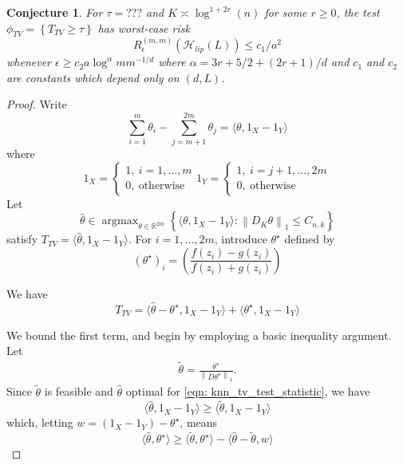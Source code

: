 \documentclass{article}
\newcommand{\Reals}{\mathbb{R}}
\newcommand{\norm}[1]{\left\lVert#1\right\rVert}
\newcommand{\set}[1]{\left\{#1\right\}}
\newcommand{\dotp}[2]{\langle #1, #2 \rangle}
\newcommand{\1}{\mathbb{I}}
\DeclareMathOperator*{\argmax}{argmax}
\newcommand{\Hclass}{\mathcal{H}}
\theoremstyle{alden}
\theoremstyle{aldenthm}
\newtheorem{conjecture}{Conjecture}
\theoremstyle{definition}
\theoremstyle{remark}
\begin{document}
\begin{conjecture}
	For $\tau = ???$ and $K \asymp \log^{1 + 2r}(n)$ for some $r \geq 0$, the test $\phi_{TV} = \set{T_{TV} \geq \tau}$ has worst-case risk
	\begin{equation*}
	R_{\epsilon}^{(m,m)}(\Hclass_{lip}(L)) \leq c_1/a^2
	\end{equation*}
	whenever $\epsilon \geq c_2 a \log^{\alpha}m m^{-1/d}$ where $\alpha = 3r + 5/2 + (2r + 1)/d$ and $c_1$ and $c_2$ are constants which depend only on $(d,L)$.
\end{conjecture}
\begin{proof}
	Write
	\begin{equation*}
	\sum_{i = 1}^{m} \theta_i - \sum_{j = m + 1}^{2m} \theta_j = \dotp{\theta}{1_X - 1_Y}
	\end{equation*}
	where
	\begin{equation*}
	1_X = 
	\begin{cases}
	1,~ i = 1, \ldots,m \\
	0,~ \text{otherwise}
	\end{cases}
	1_Y = 
	\begin{cases}
	1,~ i = j + 1, \ldots,2m \\
	0,~ \text{otherwise}
	\end{cases}
	\end{equation*}
	Let
	\begin{equation*}
	\widehat{\theta} \in \argmax_{\theta \in \Reals^{2m}} \set{\dotp{\theta}{1_X - 1_Y}: \norm{D_K \theta}_1 \leq C_{n,k}}
	\end{equation*}
	satisfy $T_{TV} = \dotp{\widehat{\theta}}{1_X - 1_Y}$. For $i = 1, \ldots, 2m$, introduce $\theta^{\star}$ defined by
	\begin{equation*}
	(\theta^{\star})_i = \left(\frac{f(z_i) - g(z_i)}{f(z_i) + g(z_i)} \right)	\end{equation*}
	
	We have
	\begin{equation*}
	T_{TV} = \dotp{\widehat{\theta} - \theta^{\star}}{1_X - 1_Y} + \dotp{\theta^{\star}}{1_X - 1_Y}
	\end{equation*}
	
	We bound the first term, and begin by employing a basic inequality argument. Let
	\begin{align*}
	\widetilde{\theta} = \frac{\theta^{\star}}{\norm{D\theta^{\star}}_1}.
	\end{align*}
	Since $\widetilde{\theta}$ is feasible and $\widehat{\theta}$ optimal for \eqref{eqn: knn_tv_test_statistic}, we have
	\begin{equation*}
	\dotp{\widehat{\theta}}{1_X - 1_Y} \geq \dotp{\widetilde{\theta}}{1_X - 1_Y}
	\end{equation*}
	which, letting $w = (1_X - 1_Y) - \theta^{\star}$, means
	\begin{equation}
	\label{eqn: basic_inequality_1}
	\dotp{\widehat{\theta}}{\theta^{\star}} \geq \dotp{\widetilde{\theta}}{\theta^{\star}} - \dotp{\widehat{\theta} - \widetilde{\theta}}{w}
	\end{equation}
	

\end{proof}
\end{document}
